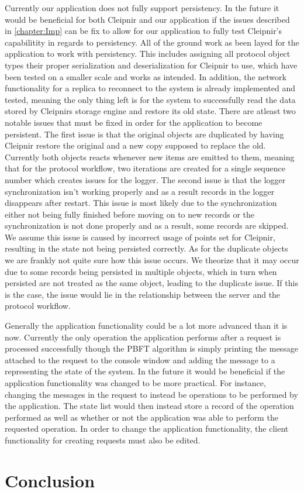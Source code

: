 Currently our application does not fully support persistency. In the future it would be beneficial for both Cleipnir and our application if the issues described in \autoref{chapter:Imp} can be fix to allow for our application to fully test Cleipnir's capabilitity in regards to persistency. All of the ground work as been layed for the application to work with persistency. This includes assigning all protocol object types their proper serialization and deserialization for Cleipnir to use, which have been tested on a smaller scale and works as intended. In addition, the network functionality for a replica to reconnect to the system is already implemented and tested, meaning the only thing left is for the system to successfully read the data stored by Cleipnirs storage engine and restore its old state. 
There are atleast two notable issues that must be fixed in order for the application to become persistent. The first issue is that the original  objects are duplicated by having Cleipnir restore the original  and a new copy supposed to replace the old. Currently both  objects reacts whenever new items are emitted to them, meaning that for the protocol workflow, two iterations are created for a single sequence number which creates issues for the logger. The second issue is that the logger synchronization isn't working properly and as a result records in the logger disappears after restart. This issue is most likely due to the synchronization either not being fully finished before moving on to new records or the synchronization is not done properly and as a result, some records are skipped. We assume this issue is caused by incorrect usage of  points set for Cleipnir, resulting in the state not being persisted correctly. As for the duplicate  objects we are frankly not quite sure how this issue occurs. We theorize that it may occur due to some records being persisted in multiple objects, which in turn when persisted are not treated as the same  object, leading to the duplicate issue. If this is the case, the issue would lie in the relationship between the server and the protocol workflow. 

Generally the application functionality could be a lot more advanced than it is now. Currently the only operation the application performs after a request is processed successfully though the PBFT algorithm is simply printing the message attached to the request to the console window and adding the message to a  representing the state of the system. In the future it would be beneficial if the application functionality was changed to be more practical. For instance, changing the messages in the request to instead be operations to be performed by the application. The state list would then instead store a record of the operation performed as well as whether or not the application was able to perform the requested operation. In order to change the application functionality, the client functionality for creating requests must also be edited.

\section{Conclusion}
